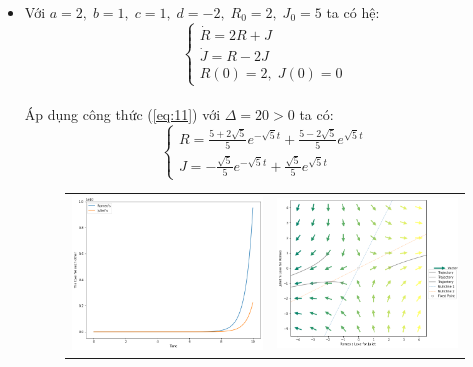 \documentclass[a4paper]{article}
\begin{document}
\begin{enumerate}
    \begin{itemize}
    \item Với $a = 2,\;b = 1,\;c = 1,\;d = -2,\;R_0 = 2,\;J_0 = 5$ ta có hệ:
    $$\begin{cases} \dot{R}=2R+J \\ \dot{J}=R-2J \\ R(0)=2,\;J(0)=0 \end{cases}$$ \\
    Áp dụng công thức (\ref{eq:11}) với $\Delta = 20 > 0$ ta có:
    $$\begin{cases}
        R = \frac{5+2\sqrt{5}}{5}e^{-\sqrt{5}t} + \frac{5-2\sqrt{5}}{5}e^{\sqrt{5}t} \\[4pt]
        J = -\frac{\sqrt{5}}{5}e^{-\sqrt{5}t} + \frac{\sqrt{5}}{5}e^{\sqrt{5}t}
    \end{cases}$$
    \begin{figure}[htp]
        \centering
        \begin{tabular}{cc}
            \includegraphics[scale = .33]{Images/Bt2/2.1_gr.png} &
            \includegraphics[scale = .33]{Images/Bt2/2.1_phase.png} \\

\end{tabular}
\end{figure}
\end{itemize}
\end{enumerate}
\end{document}
